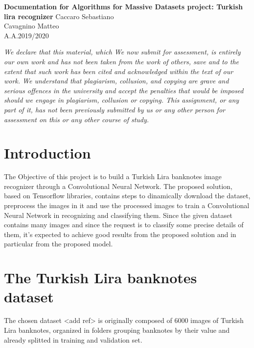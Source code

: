 \documentclass[a4paper,12pt]{article}
\begin{document}
\begin{titlepage}
\begin{center}
	\Large{\textbf{Documentation for Algorithms for Massive Datasets project: Turkish lira recognizer}}
\vfill
\normalsize{Caccaro Sebastiano}\\
\normalsize{Cavagnino Matteo}\\
\normalsize{A.A.2019/2020}
\end{center}
\end{titlepage}

\vspace*{\fill}
\textit{We declare that this material, which We now submit for assessment, is entirely our own work and has not been taken from the work of others, save and to the extent that such work has been cited and acknowledged within the text of our work. We understand that plagiarism, collusion, and copying are grave and serious offences in the university and accept the penalties that would be imposed should we engage in plagiarism, collusion or copying. This assignment, or any part of it, has not been previously submitted by us or any other person for assessment on this or any other course of study.}
\vspace*{\fill}

\newpage

\tableofcontents

\clearpage


\newpage
\section{Introduction}
The Objective of this project is to build a Turkish Lira banknotes image recognizer through a Convolutional Neural Network.
The proposed solution, based on Tensorflow libraries, contains steps to dinamically download the dataset, preprocess the images in it and use the processed images to train a 
Convolutional Neural Network in recognizing and classifying them.
Since the given dataset contains many images and since the request is to classify some precise details of them, it's expected to achieve good results from the proposed solution and in particular
from the proposed model.

\newpage
\section{The Turkish Lira banknotes dataset}
The chosen dataset <add ref> is originally composed of 6000 images of Turkish Lira banknotes, 
organized in folders grouping banknotes by their value and already splitted in training and validation set.
\end{document}
